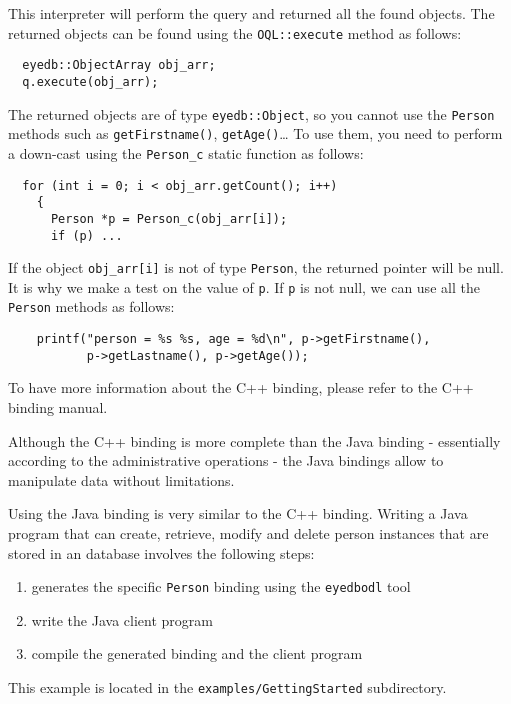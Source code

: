 This interpreter will perform the query and returned all the found objects.
The returned objects can be found using the \texttt{OQL::execute} method
as follows:
\verbsize \begin{verbatim}
  eyedb::ObjectArray obj_arr;
  q.execute(obj_arr);
\end{verbatim}
\normalsize

The returned objects are of type \texttt{eyedb::Object}, so you cannot use the
\texttt{Person} methods such as \texttt{getFirstname()}, \texttt{getAge()}\ldots
To use them, you need to perform a down-cast using the \texttt{Person\_c} static
function as follows:
\verbsize \begin{verbatim}
  for (int i = 0; i < obj_arr.getCount(); i++)
    {
      Person *p = Person_c(obj_arr[i]);
      if (p) ...
\end{verbatim}
\normalsize
If the object \texttt{obj\_arr[i]} is not of type \texttt{Person}, the returned
pointer will be null. It is why we make a test on the value of \texttt{p}.
If \texttt{p} is not null, we can use all the \texttt{Person} methods as follows:
\verbsize \begin{verbatim}
    printf("person = %
           p->getLastname(), p->getAge());
\end{verbatim}
\normalsize

To have more information about the C++ binding, please refer to the
\eyedb C++ binding manual.



Although the C++ binding is more complete than the Java binding
- essentially according to the administrative operations - the Java
bindings allow to manipulate data without limitations.

Using the Java binding is very similar to the C++ binding. Writing a
Java program that can create, retrieve, modify and delete person
instances that are stored in an \eyedb database involves the following
steps:
\begin{enumerate}
\item generates the specific \texttt{Person} binding using the \texttt{eyedbodl} tool
\item write the Java client program
\item compile the generated binding and the client program
\end{enumerate}

This example is located in the \texttt{examples/GettingStarted} subdirectory.


